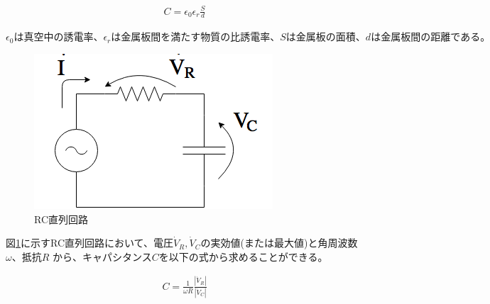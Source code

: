 \documentclass[dvipdfmx]{jsarticle}
\begin{document}
\begin{eqnarray}
  C = \epsilon_0 \epsilon_r \frac{S}{d}
\end{eqnarray}

$\epsilon_0は真空中の誘電率、\epsilon_rは金属板間を満たす物質の比誘電率、Sは金属板の
面積、dは金属板間の距離である。$

\begin{figure}[h]
  \centering
  \includegraphics[scale=0.4]{RC_Series_Circuit.png}
  \caption{RC直列回路}
  \label{fig:RC_Series_Circuit}
\end{figure}

図\ref{fig:RC_Series_Circuit}に示すRC直列回路において、電圧$\dot V_R, \dot V_C$の実効値(または最大値)と角周波数$\omega、抵抗R$
から、キャパシタンス$C$を以下の式から求めることができる。

\begin{eqnarray}
  C = \frac{1}{\omega R} \frac{|\dot V_R|}{|\dot V_C|}
\end{eqnarray}
\end{document}
